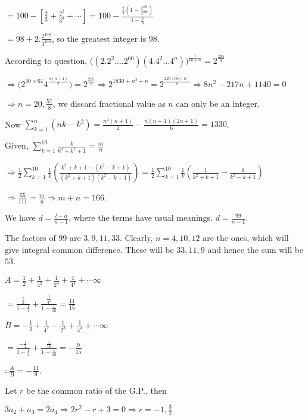   $= 100 - \left[\frac{2}{3} + \frac{2^2}{3^2} + \cdots\right] = 100 - \frac{\frac{2}{3}\left(1 -
    \frac{2^{100}}{3^{100}}\right)}{1 - \frac{2}{3}}$

  $= 98 + 2.\frac{2^{100}}{3^{100}}$, so the greatest integer is $98$.
\item According to question, $\big(\left(2.2^2.\ldots2^{60}\right)\left(4.4^2\ldots4^n\right))^{\frac{1}{60
    + n}} = 2^{\frac{225}{8}}$

  $\Rightarrow \big(2^{30\times61}4^{\frac{n(n + 1)}{2}}) = 2^{\frac{225}{8}}\Rightarrow 2^{1830 + n^2 + n}
  = 2^{\frac{225(60 + n)}{8}}\Rightarrow 8n^2 - 217n + 1140 = 0$

  $\Rightarrow n = 20, \frac{57}{8}$, we discard fractional value as $n$ can only be an integer.

  Now $\displaystyle\sum_{k = 1}^n(nk -k^2) = \frac{n^2(n + 1)}{2} - \frac{n(n + 1)(2n + 1)}{6} = 1330$.
\item Given, $\displaystyle\sum_{k = 1}^{10}\frac{k}{k^4 + k^2 + 1} = \frac{m}{n}$

  $\Rightarrow \frac{1}{2}\displaystyle\sum_{k = 1}^{10}\frac{1}{k}\left(\frac{k^2 + k + 1 - (k^2 - k + 1)}{(k^2 + k + 1)(k^2
  - k + 1)}\right) = \frac{1}{2}\displaystyle\sum_{k = 1}^{10}\frac{1}{k}\left(\frac{1}{k^2 + k + 1} - \frac{1}{k^2
  - k + 1}\right)$

  $\Rightarrow \frac{55}{111} = \frac{m}{n}\Rightarrow m + n = 166$.
\item We have $d = \frac{l - a}{n - 1}$, where the terms have usual meanings. $d = \frac{99}{n - 1}$.

  The factors of $99$ are $3, 9, 11, 33$. Clearly, $n = 4, 10, 12$ are the ones, which will give integral
  common difference. These will be $33, 11, 9$ and hence the sum will be $53$.
\item $A = \frac{1}{2} + \frac{1}{4^2} + \frac{1}{2^3} + \frac{1}{4^4} + \cdots \infty$

  $= \frac{\frac{1}{2}}{1 - \frac{1}{4}} + \frac{\frac{1}{4^2}}{1 - \frac{1}{16}} = \frac{11}{15}$

  $B = -\frac{1}{2} + \frac{1}{4^2} - \frac{1}{2^3} + \frac{1}{4^4} + \cdots \infty$

  $= \frac{-\frac{1}{2}}{1 - \frac{1}{4}} + \frac{\frac{1}{16}}{1 - \frac{1}{16}} = -\frac{9}{15}$

  $\therefore \frac{A}{B} = -\frac{11}{9}$.
\item Let $r$ be the common ratio of the G.P., then

  $3a_2 + a_3 = 2a_4 \Rightarrow 2r^2 - r + 3 = 0 \Rightarrow r = -1, \frac{3}{2}$

